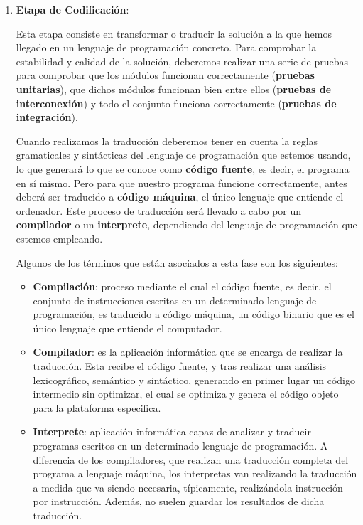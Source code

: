 \begin{enumerate}
    \item \textbf{Etapa de Codificación}:

    Esta etapa consiste en transformar o traducir la solución a la que hemos llegado en un lenguaje de programación concreto. Para comprobar la estabilidad y calidad de la solución, deberemos realizar una serie de pruebas para comprobar que los módulos funcionan correctamente (\textbf{pruebas unitarias}), que dichos módulos funcionan bien entre ellos (\textbf{pruebas de interconexión}) y todo el conjunto funciona correctamente (\textbf{pruebas de integración}).

    Cuando realizamos la traducción deberemos tener en cuenta la reglas gramaticales y sintácticas del lenguaje de programación que estemos usando, lo que generará lo que se conoce como \textbf{código fuente}, es decir, el programa en sí mismo. Pero para que nuestro programa funcione correctamente, antes deberá ser traducido a \textbf{código máquina}, el único lenguaje que entiende el ordenador. Este proceso de traducción será llevado a cabo por un \textbf{compilador} o un \textbf{interprete}, dependiendo del lenguaje de programación que estemos empleando.

    Algunos de los términos que están asociados a esta fase son los siguientes:

    \begin{itemize}
        \item \textbf{Compilación}: proceso mediante el cual el código fuente, es decir, el conjunto de instrucciones escritas en un determinado lenguaje de programación, es traducido a código máquina, un código binario que es el único lenguaje que entiende el computador.

        \item \textbf{Compilador}: es la aplicación informática que se encarga de realizar la traducción. Esta recibe el código fuente, y tras realizar una análisis lexicográfico, semántico y sintáctico, generando en primer lugar un código intermedio sin optimizar, el cual se optimiza y genera el código objeto para la plataforma especifica.

        \item \textbf{Interprete}: aplicación informática capaz de analizar y traducir programas escritos en un determinado lenguaje de programación. A diferencia de los compiladores, que realizan una traducción completa del programa a lenguaje máquina, los interpretas van realizando la traducción a medida que va siendo necesaria, típicamente, realizándola instrucción por instrucción. Además, no suelen guardar los resultados de dicha traducción.
    \end{itemize}


\end{enumerate}
